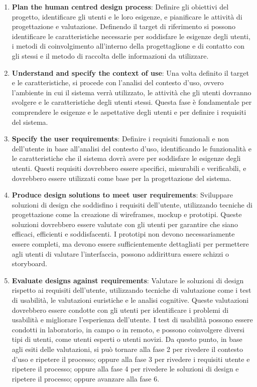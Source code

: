\documentclass{report}
\begin{document}
	\begin{enumerate}
		\item \textbf{Plan the human centred design process}: Definire gli obiettivi del progetto, identificare gli utenti e le loro esigenze, e pianificare le attività di progettazione e valutazione. Definendo il target di riferimento si possono identificare le caratteristiche necessarie per soddisfare le esigenze degli utenti, i metodi di coinvolgimento all'interno della progettaglione e di contatto con gli stessi e il metodo di raccolta delle informazioni da utilizzare.
		\item \textbf{Understand and specify the context of use}: Una volta definito il target e le caratteristiche, si procede con l'analisi del contesto d'uso, ovvero l'ambiente in cui il sistema verrà utilizzato, le attività che gli utenti dovranno svolgere e le caratteristiche degli utenti stessi. Questa fase è fondamentale per comprendere le esigenze e le aspettative degli utenti e per definire i requisiti del sistema.
		\item \textbf{Specify the user requirements}: Definire i requisiti funzionali e non dell'utente in base all'analisi del contesto d'uso, identificando le funzionalità e le caratteristiche che il sistema dovrà avere per soddisfare le esigenze degli utenti. Questi requisiti dovrebbero essere specifici, misurabili e verificabili, e dovrebbero essere utilizzati come base per la progettazione del sistema.
		\item \textbf{Produce design solutions to meet user requirements}: Sviluppare soluzioni di design che soddisfino i requisiti dell'utente, utilizzando tecniche di progettazione come la creazione di wireframes, mockup e prototipi. Queste soluzioni dovrebbero essere valutate con gli utenti per garantire che siano efficaci, efficienti e soddisfacenti. I prototipi non devono necessariamente essere completi, ma devono essere sufficientemente dettagliati per permettere agli utenti di valutare l'interfaccia, possono addirittura essere schizzi o storyboard.
		\item \textbf{Evaluate designs against requirements}: Valutare le soluzioni di design rispetto ai requisiti dell'utente, utilizzando tecniche di valutazione come i test di usabilità, le valutazioni euristiche e le analisi cognitive. Queste valutazioni dovrebbero essere condotte con gli utenti per identificare i problemi di usabilità e migliorare l'esperienza dell'utente. I test di usabilità possono essere condotti in laboratorio, in campo o in remoto, e possono coinvolgere diversi tipi di utenti, come utenti esperti o utenti novizi. Da questo punto, in base agli esiti delle valutazioni, si può tornare alla fase 2 per rivedere il contesto d'uso e ripetere il processo; oppure alla fase 3 per rivedere i requisiti utente e ripetere il processo; oppure alla fase 4 per rivedere le soluzioni di design e ripetere il processo; oppure avanzare alla fase 6.

\end{enumerate}
\end{document}
